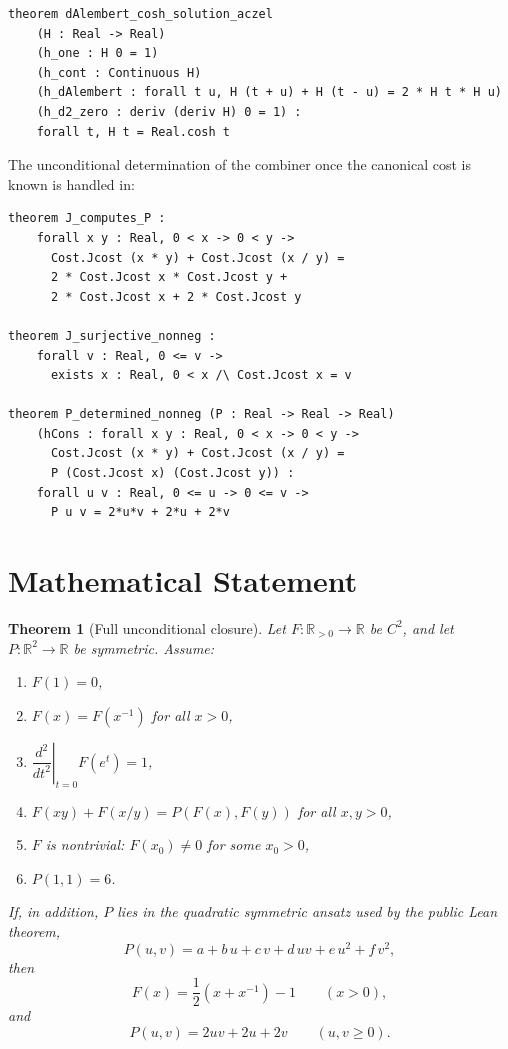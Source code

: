\documentclass[11pt]{article}
\theoremstyle{plain}
\newtheorem{theorem}{Theorem}
\newcommand{\RR}{\mathbb{R}}
\newcommand{\Rp}{\RR_{>0}}
\begin{document}
\begin{lstlisting}[style=lean]
theorem dAlembert_cosh_solution_aczel
    (H : Real -> Real)
    (h_one : H 0 = 1)
    (h_cont : Continuous H)
    (h_dAlembert : forall t u, H (t + u) + H (t - u) = 2 * H t * H u)
    (h_d2_zero : deriv (deriv H) 0 = 1) :
    forall t, H t = Real.cosh t
\end{lstlisting}

The unconditional determination of the combiner once the canonical cost is known
is handled in:

\begin{lstlisting}[style=lean]
theorem J_computes_P :
    forall x y : Real, 0 < x -> 0 < y ->
      Cost.Jcost (x * y) + Cost.Jcost (x / y) =
      2 * Cost.Jcost x * Cost.Jcost y +
      2 * Cost.Jcost x + 2 * Cost.Jcost y

theorem J_surjective_nonneg :
    forall v : Real, 0 <= v ->
      exists x : Real, 0 < x /\ Cost.Jcost x = v

theorem P_determined_nonneg (P : Real -> Real -> Real)
    (hCons : forall x y : Real, 0 < x -> 0 < y ->
      Cost.Jcost (x * y) + Cost.Jcost (x / y) =
      P (Cost.Jcost x) (Cost.Jcost y)) :
    forall u v : Real, 0 <= u -> 0 <= v ->
      P u v = 2*u*v + 2*u + 2*v
\end{lstlisting}

\section*{Mathematical Statement}
\begin{theorem}[Full unconditional closure]
Let $F:\Rp \to \RR$ be $C^2$, and let $P:\RR^2 \to \RR$ be symmetric.
Assume:
\begin{enumerate}[label=\textup{(\roman*)},nosep]
\item $F(1)=0$,
\item $F(x)=F(x^{-1})$ for all $x>0$,
\item $\left.\dfrac{d^2}{dt^2}\right|_{t=0} F(e^t)=1$,
\item $F(xy)+F(x/y)=P(F(x),F(y))$ for all $x,y>0$,
\item $F$ is nontrivial: $F(x_0)\neq 0$ for some $x_0>0$,
\item $P(1,1)=6$.
\end{enumerate}
If, in addition, $P$ lies in the quadratic symmetric ansatz used by the public
Lean theorem,
\[
P(u,v)=a+b\,u+c\,v+d\,uv+e\,u^2+f\,v^2,
\]
then
\[
F(x)=\frac12(x+x^{-1})-1 \qquad (x>0),
\]
and
\[
P(u,v)=2uv+2u+2v \qquad (u,v\ge 0).
\]
\end{theorem}
\end{document}
